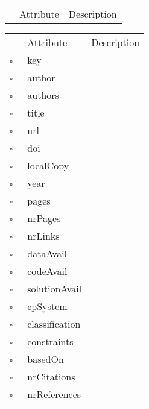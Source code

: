 \begin{table}
\caption{School  }

\begin{longtable}{llp{8cm}}
& Attribute & Description \\
\end{longtable}
\label{attr:School}
\end{table}

\begin{table}
\caption{Work  }

\begin{longtable}{llp{8cm}}
& Attribute & Description \\
$\square$\ & key &  \\
$\square$\ & author &  \\
$\square$\ & authors &  \\
$\square$\ & title &  \\
$\square$\ & url &  \\
$\square$\ & doi &  \\
$\square$\ & localCopy &  \\
$\square$\ & year &  \\
$\square$\ & pages &  \\
$\square$\ & nrPages &  \\
$\square$\ & nrLinks &  \\
$\square$\ & dataAvail &  \\
$\square$\ & codeAvail &  \\
$\square$\ & solutionAvail &  \\
$\square$\ & cpSystem &  \\
$\square$\ & classification &  \\
$\square$\ & constraints &  \\
$\square$\ & basedOn &  \\
$\square$\ & nrCitations &  \\
$\square$\ & nrReferences &  \\
\end{longtable}
\label{attr:Work}
\end{table}
